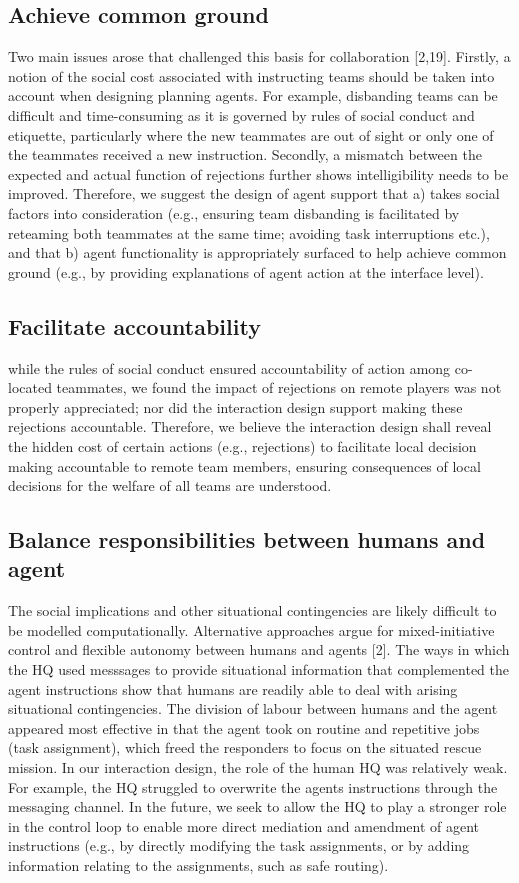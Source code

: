 \subsection{Achieve common ground}  
Two main issues arose that challenged this basis for collaboration [2,19]. Firstly, a notion of the social cost associated with instructing teams should be taken into account when designing planning agents. For example, disbanding teams can be difficult and time-consuming as it is governed by rules of social conduct and etiquette, particularly where the new teammates are out of sight or only one of the teammates received a new instruction. Secondly, a mismatch between the expected and actual function of rejections further shows intelligibility needs to be improved. Therefore, we suggest the design of agent support that a) takes social factors into consideration (e.g., ensuring team disbanding is facilitated by reteaming both teammates at the same time; avoiding task interruptions etc.), and that b) agent functionality is appropriately surfaced to help achieve common ground (e.g., by providing explanations of agent action at the interface level).

\subsection{Facilitate accountability}
while the rules of social conduct ensured accountability of action among co-located teammates, we found the impact of rejections on remote players was not properly appreciated; nor did the interaction design support making these rejections accountable. Therefore, we believe the interaction design shall reveal the hidden cost of certain actions (e.g., rejections) to facilitate local decision making accountable to remote team members, ensuring consequences of local decisions for the welfare of all teams are understood. 

\subsection{Balance responsibilities between humans and agent}\label{sec:balanceResponsibility}
 The social implications and other situational contingencies are likely difficult to be modelled computationally. Alternative approaches argue for mixed-initiative  control and flexible autonomy between humans and agents [2]. The ways in which the HQ used messsages to provide situational information that complemented the agent instructions show that humans are readily able to deal with arising situational contingencies. The division of labour between humans and the agent appeared most effective in that the agent took on routine and repetitive jobs (task assignment), which freed the responders to focus on the situated rescue mission. In our interaction design, the role of the human HQ was relatively weak. For example, the HQ struggled to overwrite the agents instructions through the messaging channel. In the future, we seek to allow the HQ to play a stronger role in the control loop to enable more direct mediation and amendment of agent instructions (e.g., by directly modifying the task assignments, or by adding information relating to the assignments, such as safe routing).
 
